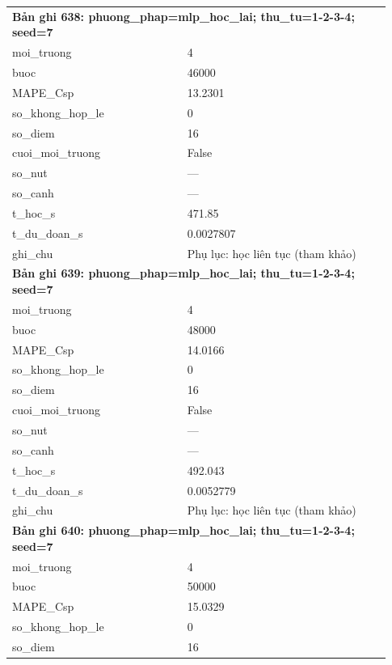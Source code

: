 \begin{longtable}{p{0.43\linewidth}p{0.50\linewidth}}
\midrule
\multicolumn{2}{p{0.95\linewidth}}{\textbf{Bản ghi 638: phuong\_phap=mlp\_hoc\_lai; thu\_tu=1-2-3-4; seed=7}} \\
moi\_\allowbreak truong & 4 \\
buoc & 46000 \\
MAPE\_\allowbreak Csp & 13.2301 \\
so\_\allowbreak khong\_\allowbreak hop\_\allowbreak le & 0 \\
so\_\allowbreak diem & 16 \\
cuoi\_\allowbreak moi\_\allowbreak truong & False \\
so\_\allowbreak nut & — \\
so\_\allowbreak canh & — \\
t\_\allowbreak hoc\_\allowbreak s & 471.85 \\
t\_\allowbreak du\_\allowbreak doan\_\allowbreak s & 0.0027807 \\
ghi\_\allowbreak chu & Phụ lục: học liên tục (tham khảo) \\
\midrule
\multicolumn{2}{p{0.95\linewidth}}{\textbf{Bản ghi 639: phuong\_phap=mlp\_hoc\_lai; thu\_tu=1-2-3-4; seed=7}} \\
moi\_\allowbreak truong & 4 \\
buoc & 48000 \\
MAPE\_\allowbreak Csp & 14.0166 \\
so\_\allowbreak khong\_\allowbreak hop\_\allowbreak le & 0 \\
so\_\allowbreak diem & 16 \\
cuoi\_\allowbreak moi\_\allowbreak truong & False \\
so\_\allowbreak nut & — \\
so\_\allowbreak canh & — \\
t\_\allowbreak hoc\_\allowbreak s & 492.043 \\
t\_\allowbreak du\_\allowbreak doan\_\allowbreak s & 0.0052779 \\
ghi\_\allowbreak chu & Phụ lục: học liên tục (tham khảo) \\
\midrule
\multicolumn{2}{p{0.95\linewidth}}{\textbf{Bản ghi 640: phuong\_phap=mlp\_hoc\_lai; thu\_tu=1-2-3-4; seed=7}} \\
moi\_\allowbreak truong & 4 \\
buoc & 50000 \\
MAPE\_\allowbreak Csp & 15.0329 \\
so\_\allowbreak khong\_\allowbreak hop\_\allowbreak le & 0 \\
so\_\allowbreak diem & 16 \\

\end{longtable}
